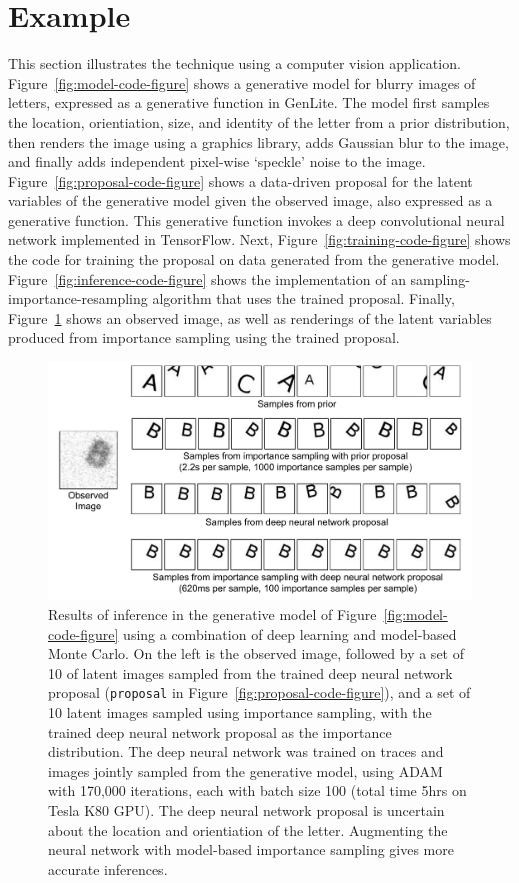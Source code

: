 \documentclass{article}
\begin{document}
\section{Example}
This section illustrates the technique using a computer vision application.
Figure~\ref{fig:model-code-figure} shows a generative model for blurry images of letters, expressed as a generative function in GenLite.
The model first samples the location, orientiation, size, and identity of the letter from a prior distribution, then renders the image using a graphics library, adds Gaussian blur to the image, and finally adds independent pixel-wise `speckle' noise to the image.
Figure~\ref{fig:proposal-code-figure} shows a data-driven proposal for the latent variables of the generative model given the observed image, also expressed as a generative function.
This generative function invokes a deep convolutional neural network implemented in TensorFlow.
Next, Figure~\ref{fig:training-code-figure} shows the code for training the proposal on data generated from the generative model.
Figure~\ref{fig:inference-code-figure} shows the implementation of an sampling-importance-resampling algorithm that uses the trained proposal.
Finally, Figure~\ref{fig:example-results} shows an observed image, as well as renderings of the latent variables produced from importance sampling using the trained proposal.

\begin{figure}[h]
\centering
    \includegraphics[width=1.0\textwidth]{images/deep-neural-network-is.pdf}
    \caption{
Results of inference in the generative model of Figure~\ref{fig:model-code-figure} using a combination of deep learning and model-based Monte Carlo.
On the left is the observed image, followed by a set of 10 of latent images sampled from the trained deep neural network proposal (\texttt{proposal} in Figure~\ref{fig:proposal-code-figure}), and a set of 10 latent images sampled using importance sampling, with the trained deep neural network proposal as the importance distribution.
The deep neural network was trained on traces and images jointly sampled from the generative model, using ADAM with 170,000 iterations, each with batch size 100 (total time 5hrs on Tesla K80 GPU).
The deep neural network proposal is uncertain about the location and orientiation of the letter.
Augmenting the neural network with model-based importance sampling gives more accurate inferences.
}
    \label{fig:example-results}
\end{figure}
\end{document}
